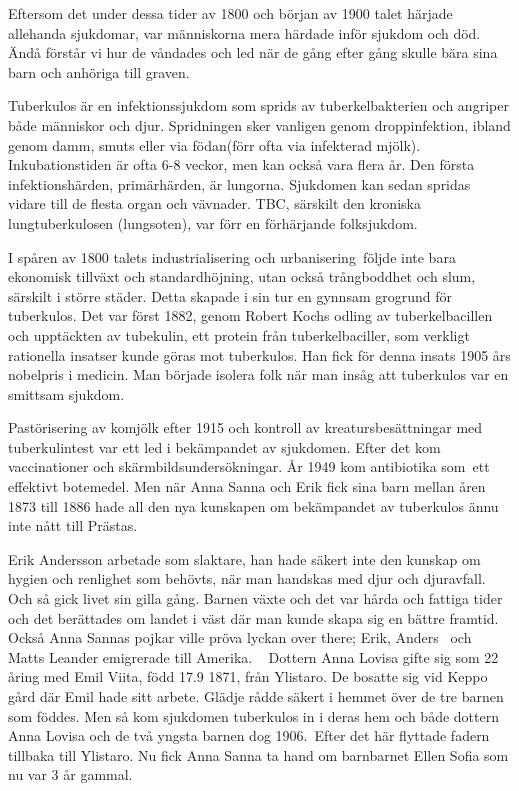 Eftersom det under dessa tider av 1800 och början av 1900 talet härjade allehanda sjukdomar, var människorna mera härdade inför sjukdom och död. Ändå förstår vi hur de våndades och led när de gång efter gång skulle bära sina barn och anhöriga till graven.



Tuberkulos är en infektionssjukdom som sprids av tuberkelbakterien och angriper både människor och djur. Spridningen sker vanligen genom droppinfektion, ibland genom damm, smuts eller via födan(förr ofta via infekterad mjölk). Inkubationstiden är ofta 6-8 veckor, men kan också vara flera år. Den första infektionshärden, primärhärden, är lungorna. Sjukdomen kan sedan spridas vidare till de flesta organ och vävnader. TBC, särskilt den kroniska lungtuberkulosen (lungsoten), var förr en förhärjande folksjukdom.

I spåren av 1800 talets industrialisering och urbanisering följde inte bara ekonomisk tillväxt och standardhöjning, utan också trångboddhet och slum, särskilt i större städer. Detta skapade i sin tur en gynnsam grogrund för tuberkulos. Det var först 1882, genom Robert Kochs odling av tuberkelbacillen och upptäckten av tubekulin, ett protein från tuberkelbaciller, som verkligt rationella insatser kunde göras mot tuberkulos. Han fick för denna insats 1905 års nobelpris i medicin. Man började isolera folk när man insåg att tuberkulos var en smittsam sjukdom.

Pastörisering av komjölk efter 1915 och kontroll av kreatursbesättningar med tuberkulintest var ett led i bekämpandet av sjukdomen. Efter det kom vaccinationer och skärmbildsundersökningar. År 1949 kom antibiotika som ett effektivt botemedel. Men när Anna Sanna och Erik fick sina barn mellan åren 1873 till 1886 hade all den nya kunskapen om bekämpandet av tuberkulos ännu inte nått till Prästas.

Erik Andersson arbetade som slaktare, han hade säkert inte den kunskap om hygien och renlighet som behövts, när man handskas med djur och djuravfall. Och så gick livet sin gilla gång. Barnen växte och det var hårda och fattiga tider och det berättades om landet i väst där man kunde skapa sig en bättre framtid. Också Anna Sannas pojkar ville pröva lyckan over there; Erik, Anders  och Matts Leander emigrerade till Amerika.
  
Dottern Anna Lovisa gifte sig som 22 åring med Emil Viita, född 17.9 1871, från Ylistaro. De bosatte sig vid Keppo gård där Emil hade sitt arbete. Glädje rådde säkert i hemmet över de tre barnen som föddes. Men så kom sjukdomen tuberkulos in i deras hem och både dottern Anna Lovisa och de två yngsta barnen dog 1906. Efter det här flyttade fadern tillbaka till Ylistaro. Nu fick Anna Sanna ta hand om barnbarnet Ellen Sofia som nu var 3 år gammal.

